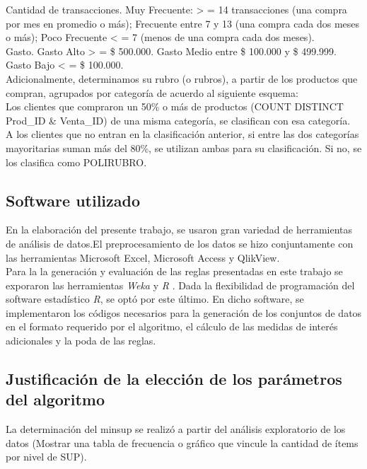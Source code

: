 \documentclass[]{article}
\begin{document}
Cantidad de transacciones. Muy Frecuente: > = 14 transacciones (una compra por mes en promedio o más); Frecuente entre 7 y 13 (una compra cada dos meses o más); Poco Frecuente < = 7 (menos de una compra cada dos meses).\\

Gasto. Gasto Alto > = \$ 500.000. Gasto Medio entre \$ 100.000 y \$ 499.999. Gasto Bajo < = \$ 100.000.\\

Adicionalmente, determinamos su rubro (o rubros), a partir de los productos que compran, agrupados por categoría de acuerdo al siguiente esquema:\\

Los clientes que compraron un 50\% o más de productos (COUNT DISTINCT Prod\_ID \& Venta\_ID) de una misma categoría, se clasifican con esa categoría.\\

A los clientes que no entran en la clasificación anterior, si entre las dos categorías mayoritarias suman más del 80\%, se utilizan ambas para su clasificación. Si no, se los clasifica como POLIRUBRO.\\

\subsection{Software utilizado}
En la elaboración del presente trabajo, se usaron gran variedad de herramientas de análisis de datos.El preprocesamiento de los datos se hizo conjuntamente con las herramientas Microsoft Excel, Microsoft Access y QlikView. \\
Para la la generación y evaluación de las reglas presentadas en este trabajo se exporaron las herramientas \textit{Weka} \cite{Weka1} y \textit{R} \cite{RCran}. Dada la flexibilidad de programación del software estadístico \textit{R}, se optó por este último. En dicho software, se implementaron los códigos necesarios para la generación de los conjuntos de datos en el formato requerido por el algoritmo, el cálculo de las medidas de interés adicionales y la poda de las reglas.

\subsection{Justificación de la elección de los parámetros del algoritmo}
La determinación del minsup se realizó a partir del análisis exploratorio de los datos (Mostrar una tabla de frecuencia o gráfico que vincule la cantidad de ítems por nivel de SUP).\\
\end{document}
